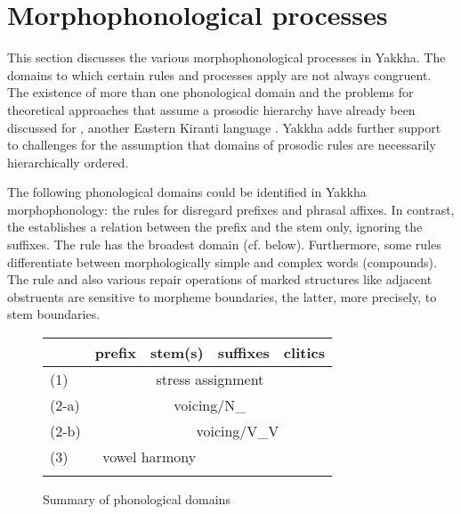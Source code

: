 \section{Morphophonological processes}\label{morphophon}



This section discusses the various morphophonological processes in Yakkha. The domains to which certain rules and processes apply are not always congruent. The existence of more than one phonological domain and the problems for theoretical approaches that assume a prosodic hierarchy have already been discussed for , another Eastern \mbox{Kiranti} language  \citep{Hildebrandt2007Prosodic, Schieringetal2010The-prosodic}. Yakkha adds further support to challenges for the assumption that domains of prosodic rules are necessarily hierarchically ordered. 

The following phonological domains could be identified in Yakkha morpho\-pho\-no\-logy: the rules for  disregard prefixes and phrasal affixes. In contrast, the  establishes a relation between the prefix and the stem only, ignoring the suffixes. The  rule has the broadest domain (cf.  below). Furthermore, some rules differentiate between morphologically simple and complex words (compounds). The  rule and also various repair operations of marked structures like adjacent obstruents are sensitive to morpheme boundaries, the latter, more precisely,  to stem boundaries. 

\begin{figure}[htp]
\begin{center}
\begin{tabular}{l|l|l|l|l} 
 \lsptoprule
	&{\bf prefix}&{\bf stem(s)}&{\bf suffixes}&{\bf clitics}\\
\hline
(1)	&\cellcolor[gray]{.8}	&\multicolumn{2}{c|}{stress assignment}&\cellcolor[gray]{.8}\\
\hline
(2-a)&	\multicolumn{4}{c}{voicing/N\_}\\
\hline
(2-b)&\cellcolor[gray]{.8}	&\multicolumn{3}{c}{voicing/V\_V}\\
\hline
(3)&\multicolumn{2}{c|}{vowel harmony}&\cellcolor[gray]{.8}&\cellcolor[gray]{.8}\\
\lspbottomrule
\end{tabular}
\caption{Summary of phonological domains}\label{w-domains}
\end{center}
\end{figure}

